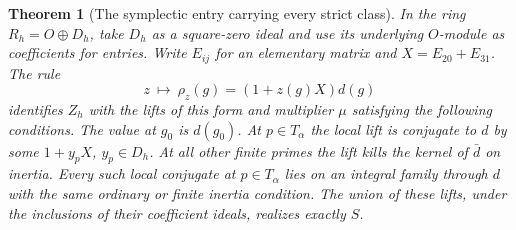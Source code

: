 \documentclass[a4paper,11pt]{article}
\newtheorem{theorem}[proposition]{Theorem}
\theoremstyle{definition}
\theoremstyle{remark}
\numberwithin{equation}{section}
\begin{document}
\begin{theorem}[The symplectic entry carrying every strict class]\leavevmode
\label{thm:symplecticclasses429}
In the ring \(R_h=O\oplus D_h\), take \(D_h\) as a
square-zero ideal and use its underlying \(O\)-module as
coefficients for entries. Write \(E_{ij}\) for an elementary
matrix and \(X=E_{20}+E_{31}\). The rule
\[
                   z\ \longmapsto\
           \rho_z(g)=(1+z(g)X)d(g)
\]
identifies \(Z_h\) with the lifts of this form and multiplier
\(\mu\) satisfying the following conditions. The value at
\(g_0\) is \(d(g_0)\). At \(p\in T_\alpha\) the local lift
is conjugate to \(d\) by some \(1+y_pX\), \(y_p\in D_h\).
At all other finite primes the lift kills the kernel of
\(\bar d\) on inertia. Every such local conjugate at
\(p\in T_\alpha\) lies on an integral family through \(d\)
with the same ordinary or finite inertia condition.
The union of these lifts, under the inclusions of their
coefficient ideals, realizes exactly \(S\).
\end{theorem}
\end{document}

